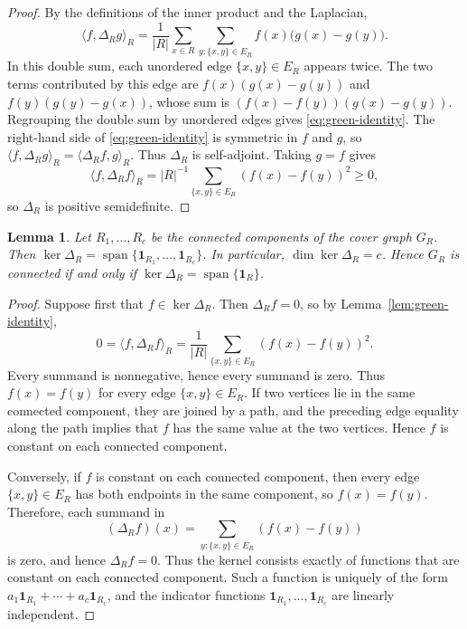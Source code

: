 \documentclass[twoside,12pt]{article}
\newtheorem{lemma}{Lemma}[section]
\begin{document}
\begin{proof}
By the definitions of the inner product and the Laplacian,
\[
 \langle f,\Delta_Rg\rangle_R
 =
 \frac1{|R|}
 \sum_{x\in R}\sum_{y:\{x,y\}\in E_R}
 f(x)\bigl(g(x)-g(y)\bigr).
\]
In this double sum, each unordered edge \(\{x,y\}\in E_R\) appears twice.
The two terms contributed by this edge are
\(f(x)(g(x)-g(y))\) and \(f(y)(g(y)-g(x))\), whose sum is
\((f(x)-f(y))(g(x)-g(y))\). Regrouping the double sum by unordered edges
gives \eqref{eq:green-identity}. The right-hand side of
\eqref{eq:green-identity} is symmetric in \(f\) and \(g\), so
\(\langle f,\Delta_Rg\rangle_R=\langle \Delta_Rf,g\rangle_R\). Thus
\(\Delta_R\) is self-adjoint. Taking \(g=f\) gives
$$\langle f,\Delta_Rf\rangle_R=|R|^{-1}\sum_{\{x,y\}\in E_R}(f(x)-f(y))^2\ge0,
$$
so \(\Delta_R\) is positive semidefinite.
\end{proof}

\begin{lemma}\label{lem:zero-eigenspace}
Let \(R_1,\ldots,R_c\) be the connected components of the cover graph
\(G_R\). Then
$\ker\Delta_R
 =
 \operatorname{span}\{\mathbf1_{R_1},\ldots,\mathbf1_{R_c}\}$.
In particular, \(\dim\ker\Delta_R=c\). Hence \(G_R\) is connected if and
only if \(\ker\Delta_R=\operatorname{span}\{\mathbf1_R\}\).
\end{lemma}
\begin{proof}
Suppose first that \(f\in\ker\Delta_R\). Then \(\Delta_Rf=0\), so by
Lemma~\ref{lem:green-identity},
\[
 0=\langle f,\Delta_Rf\rangle_R
 =
 \frac1{|R|}\sum_{\{x,y\}\in E_R}(f(x)-f(y))^2.
\]
Every summand is nonnegative, hence every summand is zero. Thus
\(f(x)=f(y)\) for every edge \(\{x,y\}\in E_R\). If two vertices lie in
the same connected component, they are joined by a path, and the preceding
edge equality along the path implies that \(f\) has the same value at the
two vertices. Hence \(f\) is constant on each connected component.

Conversely, if \(f\) is constant on each connected component, then every
edge \(\{x,y\}\in E_R\) has both endpoints in the same component, so
\(f(x)=f(y)\). Therefore, each summand in $$(\Delta_Rf)(x)=
\sum_{y:\{x,y\}\in E_R}(f(x)-f(y))$$ is zero, and hence \(\Delta_Rf=0\).
Thus the kernel consists exactly of functions that are constant on each
connected component. Such a function is uniquely of the form
\(a_1\mathbf1_{R_1}+\cdots+a_c\mathbf1_{R_c}\), and the indicator functions
\(\mathbf1_{R_1},\ldots,\mathbf1_{R_c}\) are linearly independent.
\end{proof}
\end{document}
